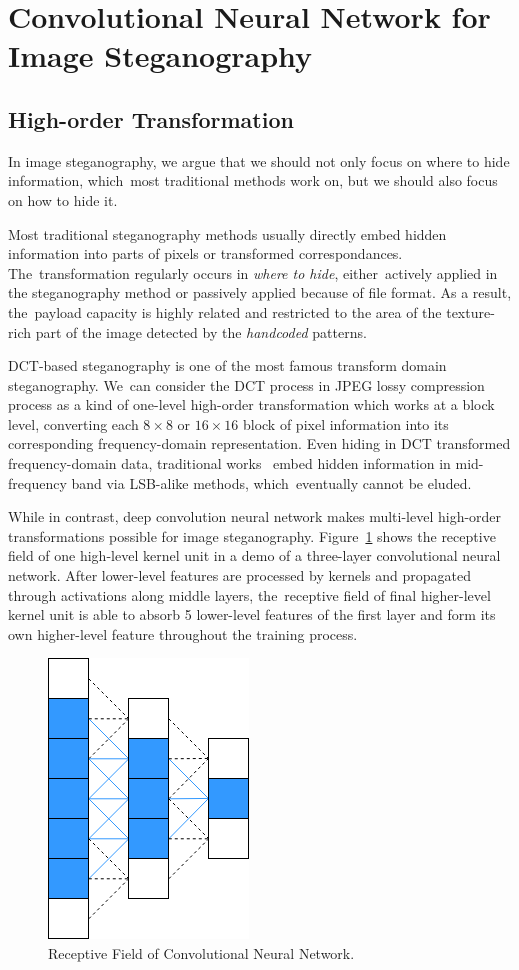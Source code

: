 \documentclass[futureinternet,article,accept,moreauthors,pdftex,10pt,a4paper]{Definitions/mdpi}
\begin{document}
%
\section{Convolutional Neural Network for Image Steganography}%
\label{sec:convsteg}

\vspace{-6pt}
\subsection{High-order Transformation}%
\label{ssec:highordertrans}

In image steganography, we argue that we should not only focus on where to hide information, which~most traditional methods work on, but we should also focus on how to hide it.

Most traditional steganography methods usually directly embed hidden information into parts of pixels or transformed correspondances. The~transformation regularly occurs in \textit{where to hide}, either~actively applied in the steganography method or passively applied because of file format. As a result, the~payload capacity is highly related and restricted to the area of the texture-rich part of the image detected by the \textit{handcoded} patterns.

DCT-based steganography is one of the most famous transform domain steganography. We~can consider the DCT process in JPEG lossy compression process as a kind of one-level high-order transformation which works at a block level, converting each \(8 \times 8\) or \(16 \times 16\) block of pixel information into its corresponding frequency-domain representation. Even hiding in DCT transformed frequency-domain data, traditional works~\cite{JPEGSteg, HCJPEG} embed hidden information in mid-frequency band via LSB-alike methods, which~eventually cannot be eluded.

While in contrast, deep convolution neural network makes multi-level high-order transformations possible for image steganography. Figure~\ref{fig:ConvReceptiveField} shows the receptive field of one high-level kernel unit in a demo of a three-layer convolutional neural network. After lower-level features are processed by kernels and propagated through activations along middle layers, the~receptive field of final higher-level kernel unit is able to absorb 5 lower-level features of the first layer and form its own higher-level feature throughout the training process.

\begin{figure}[H]
  \centering
  \includegraphics[width=0.2\linewidth]{ConvReceptiveField}
  \caption{Receptive Field of Convolutional Neural Network.}%
\label{fig:ConvReceptiveField}
\end{figure}
\end{document}
